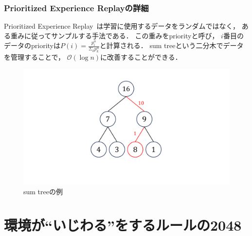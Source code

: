 \subsection{Prioritized Experience Replayの詳細}
Prioritized Experience Replay~\cite{prioritized}は学習に使用するデータをランダムではなく， ある重みに従ってサンプルする手法である．
この重みをpriorityと呼び， $i$番目のデータのpriorityは$P(i) = \frac{p_{i}^{\alpha}}{\Sigma_k p_{k}^{\alpha}}$と計算される．
sum treeという二分木でデータを管理することで， $\mathcal{O}(\log n)$に改善することができる．
\begin{figure}[t]
    \centering
    \includegraphics[width=0.6\linewidth{}]{figures/sumtree.pdf}
    \caption{sum treeの例}
    \label{fig:sumtree}
\end{figure}

\chapter{環境が“いじわる”をするルールの2048}